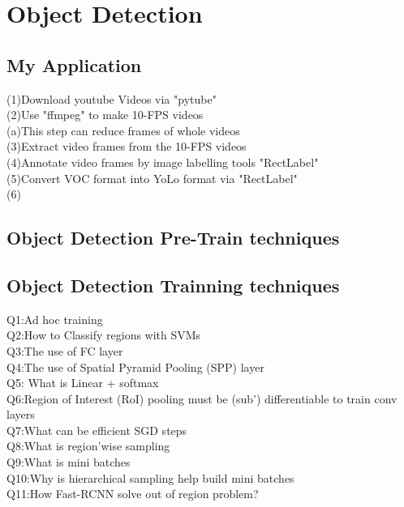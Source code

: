 \chapter{Object Detection}
\label{cha:intro}
\section{My Application}
(1)Download youtube Videos via "pytube"\\
(2)Use "ffmpeg" to make 10-FPS videos\\
	(a)This step can reduce frames of whole videos\\
(3)Extract video frames from the 10-FPS videos\\
(4)Annotate video frames by image labelling tools "RectLabel"\\
(5)Convert VOC format into YoLo format via "RectLabel"\\
(6)
\section{Object Detection Pre-Train techniques}


\section{Object Detection Trainning techniques}
Q1:Ad hoc training\\
Q2:How to Classify regions with SVMs\\
Q3:The use of FC layer\\
Q4:The use of Spatial Pyramid Pooling (SPP) layer\\
Q5: What is Linear + softmax\\
Q6:Region of Interest (RoI) pooling must be (sub') 
differentiable to train conv layers\\
Q7:What can be efficient SGD steps\\
Q8:What is region'wise sampling\\
Q9:What is mini batches\\
Q10:Why is hierarchical sampling help build mini
batches\\
Q11:How Fast-RCNN solve out of region problem?
